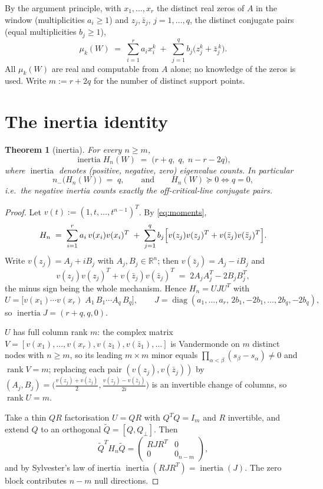 \documentclass[11pt]{article}
\theoremstyle{plain}
\newtheorem{theorem}{Theorem}
\theoremstyle{definition}
\theoremstyle{remark}
\newcommand{\R}{\mathbb{R}}
\DeclareMathOperator{\rank}{rank}
\DeclareMathOperator{\inertia}{inertia}
\begin{document}
By the argument principle, with $x_1,\dots,x_r$ the distinct real zeros of $A$ in the
window (multiplicities $a_i\ge 1$) and $z_j,\bar z_j$, $j=1,\dots,q$, the distinct
conjugate pairs (equal multiplicities $b_j \ge 1$),
\begin{equation}\label{eq:moments}
  \mu_k(W) \;=\; \sum_{i=1}^r a_i x_i^k \;+\; \sum_{j=1}^q b_j\bigl(z_j^k + \bar z_j^{\,k}\bigr).
\end{equation}
All $\mu_k(W)$ are real and computable from $A$ alone; no knowledge of the zeros is used.
Write $m := r + 2q$ for the number of distinct support points.

\section{The inertia identity}

\begin{theorem}[inertia]\label{thm:inertia}
For every $n \ge m$,
\[
  \inertia H_n(W) \;=\; \bigl(r+q,\; q,\; n-r-2q\bigr),
\]
where $\inertia$ denotes (positive, negative, zero) eigenvalue counts. In particular
\[
  n_-\bigl(H_n(W)\bigr) \;=\; q,
  \qquad\text{and}\qquad
  H_n(W) \succeq 0 \iff q = 0,
\]
i.e.\ the negative inertia counts exactly the off-critical-line conjugate pairs.
\end{theorem}

\begin{proof}
Let $v(t) := (1,t,\dots,t^{n-1})^{T}$. By \eqref{eq:moments},
\[
  H_n \;=\; \sum_{i=1}^r a_i\, v(x_i)v(x_i)^{T}
  \;+\; \sum_{j=1}^q b_j\Bigl[v(z_j)v(z_j)^{T} + v(\bar z_j)v(\bar z_j)^{T}\Bigr].
\]
Write $v(z_j) = A_j + iB_j$ with $A_j,B_j\in\R^n$; then $v(\bar z_j)=A_j-iB_j$ and
\begin{equation}\label{eq:minus}
  v(z_j)v(z_j)^{T} + v(\bar z_j)v(\bar z_j)^{T}
  \;=\; 2A_jA_j^{T} - 2B_jB_j^{T},
\end{equation}
the minus sign being the whole mechanism. Hence $H_n = UJU^{T}$ with
\[
  U = \bigl[v(x_1)\cdots v(x_r)\;A_1\,B_1\cdots A_q\,B_q\bigr],
  \qquad
  J = \operatorname{diag}(a_1,\dots,a_r,\,2b_1,-2b_1,\dots,2b_q,-2b_q),
\]
so $\inertia J = (r+q,q,0)$.

$U$ has full column rank $m$: the complex matrix
$V=[v(x_1),\dots,v(x_r),v(z_1),v(\bar z_1),\dots]$ is Vandermonde on $m$ distinct nodes
with $n\ge m$, so its leading $m\times m$ minor equals
$\prod_{\alpha<\beta}(s_\beta-s_\alpha)\ne 0$ and $\rank V=m$; replacing each pair
$(v(z_j),v(\bar z_j))$ by $(A_j,B_j) = \bigl(\tfrac{v(z_j)+v(\bar z_j)}{2},
\tfrac{v(z_j)-v(\bar z_j)}{2i}\bigr)$ is an invertible change of columns, so
$\rank U = m$.

Take a thin $QR$ factorisation $U=QR$ with $Q^{T}Q=I_m$ and $R$ invertible, and extend
$Q$ to an orthogonal $\widetilde Q = [Q,Q_\perp]$. Then
\[
  \widetilde Q^{T} H_n \widetilde Q =
  \begin{pmatrix} RJR^{T} & 0\\ 0 & 0_{n-m}\end{pmatrix},
\]
and by Sylvester's law of inertia $\inertia(RJR^{T}) = \inertia(J)$. The zero block
contributes $n-m$ null directions.
\end{proof}
\end{document}
